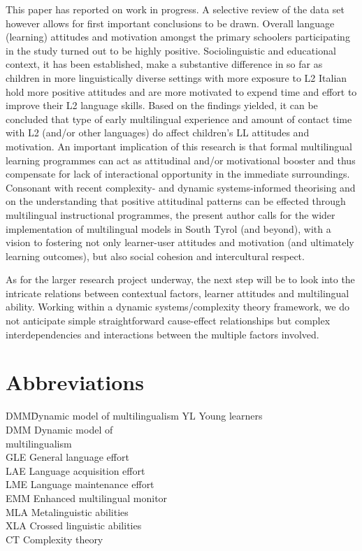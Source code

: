 \documentclass[output=paper]{../langscibook}
\begin{document}
This paper has reported on work in progress. A selective review of the data set however allows for first important conclusions to be drawn. Overall language (learning) attitudes and motivation amongst the primary schoolers participating in the study turned out to be highly positive. Sociolinguistic and educational context, it has been established, make a substantive difference in so far as children in more linguistically diverse settings with more exposure to L2 Italian hold more positive attitudes and are more motivated to expend time and effort to improve their L2 language skills. Based on the findings yielded, it can be concluded that type of early multilingual experience and amount of contact time with L2 (and/or other languages) do affect children’s LL attitudes and motivation. An important implication of this research is that formal multilingual learning programmes can act as attitudinal and/or motivational booster and thus compensate for lack of interactional opportunity in the immediate surroundings. Consonant with recent complexity- and dynamic systems-informed theorising and on the understanding that positive attitudinal patterns can be effected through multilingual instructional programmes, the present author calls for the wider implementation of multilingual models in South Tyrol (and beyond), with a vision to fostering not only learner-user attitudes and motivation (and ultimately learning outcomes), but also social cohesion and intercultural respect.

As for the larger research project underway, the next step will be to look into the intricate relations between contextual factors, learner attitudes and multilingual ability. Working within a dynamic systems\slash complexity theory framework, we do not anticipate simple straightforward cause-effect relationships but complex interdependencies and interactions between the multiple factors involved.

\section*{Abbreviations}\largerpage
\label{sec:abbreviations}
\begin{multicols}{2}
\begin{tabbing}
DMM\quad \= Dynamic model of multilingualism\kill
YL  \> Young learners\\
DMM \> Dynamic model of \\ \> multilingualism\\
GLE \> General language effort\\
LAE \> Language acquisition effort\\
LME \> Language maintenance effort\\
EMM \> Enhanced multilingual monitor\\
MLA \> Metalinguistic abilities\\
XLA \> Crossed linguistic abilities\\
CT  \> Complexity theory
\end{tabbing}
\end{multicols}


{\sloppy\printbibliography[heading=subbibliography,notkeyword=this]}
\end{document}
